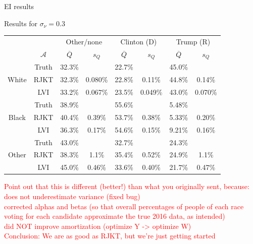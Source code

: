 \documentclass[
  ignorenonframetext,
]{beamer}
\begin{document}
\begin{frame}{EI results}
\protect\hypertarget{ei-results-1}{}

Results for \(\sigma_\nu=0.3\)

\begin{table}[htbp]
 \label{results0.3}
 \begin{tabular}{cc|cc|cc|cc}
       \multicolumn{2}{c}{}   & \multicolumn{2}{c}{Other/none} & \multicolumn{2}{c}{Clinton (D)} & \multicolumn{2}{c}{Trump (R)} \\
                   &$\mathcal{A}$       &  $\overline{Q}$         &   $s_Q$       &  $\overline{Q}$         &   $s_Q$     &  $\overline{Q}$         &   $s_Q$          \\
 \hline
\multirow{3}{*}{White} & Truth & 32.3\% &  & 22.7\% &  & 45.0\% &  \\ 
                       & RJKT & 32.3\% & 0.080\% & 22.8\% & 0.11\% & 44.8\% & 0.14\% \\ 
                       & LVI & 33.2\% & 0.067\% & 23.5\% & 0.049\% & 43.0\% & 0.070\% \\ 
   \hline
  \multirow{3}{*}{Black} & Truth & 38.9\% &  & 55.6\% &  & 5.48\% &  \\ 
   & RJKT & 40.4\% & 0.39\% & 53.7\% & 0.38\% & 5.33\% & 0.20\% \\ 
   & LVI & 36.3\% & 0.17\% & 54.6\% & 0.15\% & 9.21\% & 0.16\% \\ 
   \hline
  \multirow{3}{*}{Other} & Truth & 43.0\% &  & 32.7\% &  & 24.3\% &  \\ 
   & RJKT & 38.3\% & 1.1\% & 35.4\% & 0.52\% & 24.9\% & 1.1\% \\ 
   & LVI & 45.0\% & 0.46\% & 33.6\% & 0.40\% & 21.7\% & 0.47\% \\ 
   \hline
 \end{tabular}
 \end{table}

\textcolor{red}{{\scriptsize Point out that this is different (better!) than what you originally sent, because:\\does not underestimate variance (fixed bug)\\corrected alphas and betas (so that overall percentages of people of each race voting for each candidate approximate the true 2016 data, as intended)\\did NOT improve amortization (optimize Y -> optimize W)\\Conclusion: We are as good as RJKT, but we’re just getting started}}

\end{frame}
\end{document}
